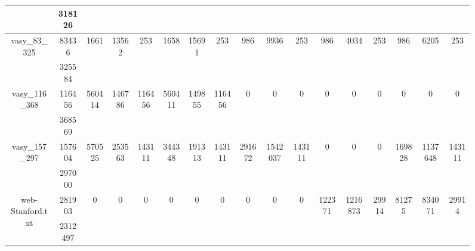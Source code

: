 \documentclass[../master/master.tex]{subfiles}
\begin{document}
\begin{figure}
\begin{adjustbox}{angle=90}
\begin{tabular}{ |c|c||c|c|c||c|c|c||c|c|c||c|c|c||c|c|c| }
\cline{2-2}
 & 318126  &  &  &  &  &  &  &  &  &  &  &  &  &  &  &  \\
\hline
\multirow{2}{3.6em}{vasy\_83\_325} & 83436 & \multirow{2}{3.6em}{1661} & \multirow{2}{3.6em}{13562 } & \multirow{2}{3.6em}{253} & \multirow{2}{3.6em}{1658} & \multirow{2}{3.6em}{15691 } & \multirow{2}{3.6em}{253} & \multirow{2}{3.6em}{986} & \multirow{2}{3.6em}{9936 } & \multirow{2}{3.6em}{253} & \multirow{2}{3.6em}{986} & \multirow{2}{3.6em}{4034 } & \multirow{2}{3.6em}{253} & \multirow{2}{3.6em}{986} & \multirow{2}{3.6em}{6205 } & \multirow{2}{3.6em}{253} \\
\cline{2-2}
 & 325584  &  &  &  &  &  &  &  &  &  &  &  &  &  &  &  \\
\hline
\multirow{2}{3.6em}{vasy\_116\_368} & 116456 & \multirow{2}{3.6em}{560414} & \multirow{2}{3.6em}{146786 } & \multirow{2}{3.6em}{116456} & \multirow{2}{3.6em}{560411} & \multirow{2}{3.6em}{149855 } & \multirow{2}{3.6em}{116456} & \multirow{2}{3.6em}{0} & \multirow{2}{3.6em}{0 } & \multirow{2}{3.6em}{0} & \multirow{2}{3.6em}{0} & \multirow{2}{3.6em}{0 } & \multirow{2}{3.6em}{0} & \multirow{2}{3.6em}{0} & \multirow{2}{3.6em}{0 } & \multirow{2}{3.6em}{0} \\
\cline{2-2}
 & 368569  &  &  &  &  &  &  &  &  &  &  &  &  &  &  &  \\
\hline
\multirow{2}{3.6em}{vasy\_157\_297} & 157604 & \multirow{2}{3.6em}{570525} & \multirow{2}{3.6em}{253563 } & \multirow{2}{3.6em}{143111} & \multirow{2}{3.6em}{344348} & \multirow{2}{3.6em}{191313 } & \multirow{2}{3.6em}{143111} & \multirow{2}{3.6em}{291672} & \multirow{2}{3.6em}{1542037 } & \multirow{2}{3.6em}{143111} & \multirow{2}{3.6em}{0} & \multirow{2}{3.6em}{0 } & \multirow{2}{3.6em}{0} & \multirow{2}{3.6em}{169828} & \multirow{2}{3.6em}{1137648 } & \multirow{2}{3.6em}{143111} \\
\cline{2-2}
 & 297000  &  &  &  &  &  &  &  &  &  &  &  &  &  &  &  \\
\hline
\multirow{2}{3.6em}{web-Stanford.txt} & 281903 & \multirow{2}{3.6em}{0} & \multirow{2}{3.6em}{0 } & \multirow{2}{3.6em}{0} & \multirow{2}{3.6em}{0} & \multirow{2}{3.6em}{0 } & \multirow{2}{3.6em}{0} & \multirow{2}{3.6em}{0} & \multirow{2}{3.6em}{0 } & \multirow{2}{3.6em}{0} & \multirow{2}{3.6em}{122371} & \multirow{2}{3.6em}{1216873 } & \multirow{2}{3.6em}{29914} & \multirow{2}{3.6em}{81275} & \multirow{2}{3.6em}{834071 } & \multirow{2}{3.6em}{29914} \\
\cline{2-2}
 & 2312497  &  &  &  &  &  &  &  &  &  &  &  &  &  &  &  \\

\end{tabular}
\end{adjustbox}
\end{figure}
\end{document}
